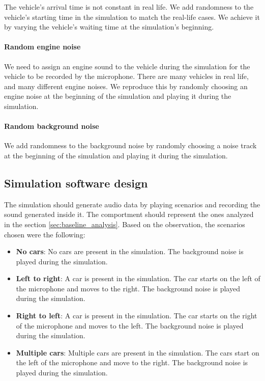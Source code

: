 The vehicle's arrival time is not constant in real life. We add randomness to the vehicle's starting time in the simulation to match the real-life cases. We achieve it by varying the vehicle's waiting time at the simulation's beginning.

\paragraph{Random engine noise}

We need to assign an engine sound to the vehicle during the simulation for the vehicle to be recorded by the microphone. There are many vehicles in real life, and many different engine noises. We reproduce this by randomly choosing an engine noise at the beginning of the simulation and playing it during the simulation. 

\paragraph{Random background noise}

We add randomness to the background noise by randomly choosing a noise track at the beginning of the simulation and playing it during the simulation.

\subsection{Simulation software design}

The simulation should generate audio data by playing scenarios and recording the sound generated inside it. The comportment should represent the ones analyzed in the section \ref{sec:baseline_analysis}. Based on the observation, the scenarios chosen were the following:

\begin{itemize}
    \item \textbf{No cars}: No cars are present in the simulation. The background noise is played during the simulation.
    \item \textbf{Left to right}: A car is present in the simulation. The car starts on the left of the microphone and moves to the right. The background noise is played during the simulation.
    \item \textbf{Right to left}: A car is present in the simulation. The car starts on the right of the microphone and moves to the left. The background noise is played during the simulation.
    \item \textbf{Multiple cars}: Multiple cars are present in the simulation. The cars start on the left of the microphone and move to the right. The background noise is played during the simulation.
\end{itemize}

